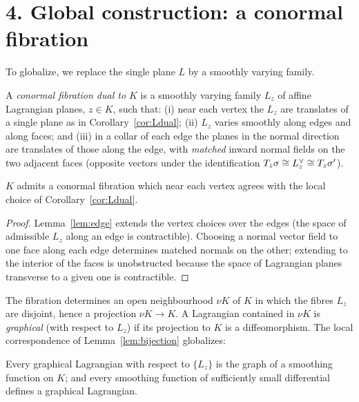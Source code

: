 \documentclass[11pt]{article}
\begin{document}
\section*{4. Global construction: a conormal fibration}

To globalize, we replace the single plane $L$ by a smoothly varying family.

\begin{qeightdefinition}\label{def:fibration}
A \emph{conormal fibration dual to $K$} is a smoothly varying family $L_z$ of
affine Lagrangian planes, $z\in K$, such that: (i) near each vertex the $L_z$ are
translates of a single plane as in Corollary~\ref{cor:Ldual}; (ii) $L_z$ varies
smoothly along edges and along faces; and (iii) in a collar of each edge the
planes in the normal direction are translates of those along the edge, with
\emph{matched} inward normal fields on the two adjacent faces (opposite vectors
under the identification $T_z\sigma\cong L^{\vee}_z\cong T_z\sigma'$).
\end{qeightdefinition}

\begin{qeightlemma}\label{lem:fibexists}
$K$ admits a conormal fibration which near each vertex agrees with the local
choice of Corollary~\ref{cor:Ldual}.
\end{qeightlemma}

\begin{proof}
Lemma~\ref{lem:edge} extends the vertex choices over the edges (the space of
admissible $L_z$ along an edge is contractible). Choosing a normal vector field
to one face along each edge determines matched normals on the other; extending to
the interior of the faces is unobstructed because the space of Lagrangian planes
transverse to a given one is contractible.
\end{proof}

The fibration determines an open neighbourhood $\nu K$ of $K$ in which the fibres
$L_z$ are disjoint, hence a projection $\nu K\to K$. A Lagrangian contained in
$\nu K$ is \emph{graphical} (with respect to $L_z$) if its projection to $K$ is a
diffeomorphism. The local correspondence of Lemma~\ref{lem:bijection} globalizes:

\begin{qeightlemma}\label{lem:graph-global}
Every graphical Lagrangian with respect to $\{L_z\}$ is the graph of a smoothing
function on $K$; and every smoothing function of sufficiently small differential
defines a graphical Lagrangian.
\end{qeightlemma}
\end{document}
